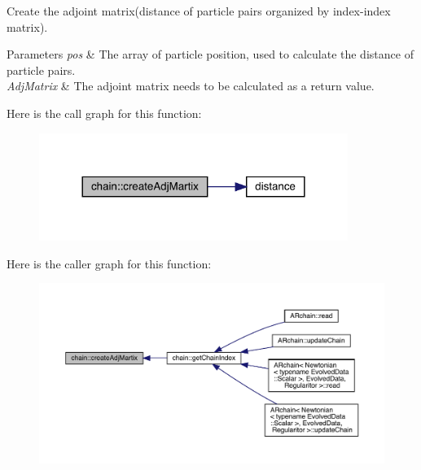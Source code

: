 Create the adjoint matrix(distance of particle pairs organized by index-\/index matrix). 
\begin{DoxyParams}{Parameters}
{\em pos} & The array of particle position, used to calculate the distance of particle pairs. \\
\hline
{\em Adj\+Matrix} & The adjoint matrix needs to be calculated as a return value. \\
\hline
\end{DoxyParams}
Here is the call graph for this function\+:\nopagebreak
\begin{figure}[H]
\begin{center}
\leavevmode
\includegraphics[width=284pt]{namespacechain_a68d5d08ece7d82a6b4bb1968b783a8f3_cgraph}
\end{center}
\end{figure}
Here is the caller graph for this function\+:\nopagebreak
\begin{figure}[H]
\begin{center}
\leavevmode
\includegraphics[width=350pt]{namespacechain_a68d5d08ece7d82a6b4bb1968b783a8f3_icgraph}
\end{center}
\end{figure}
\mbox{\label{namespacechain_ae008a8273beabf1473c347994197ef53}} 

